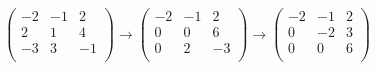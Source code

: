 \documentclass{article}
\begin{document}
\begin{displaymath}
  \displaystyle
  \left(\begin{array}{*{3}{c}}
    -2 & -1 & 2 \\
    2 & 1 & 4 \\
    -3 & 3 & -1\\
  \end{array}\right)
  \to
  \left(\begin{array}{*{3}{c}}
    -2 & -1 & 2 \\
    0 & 0 & 6 \\
    0 & 2 & -3\\
  \end{array}\right)
  \to
  \left(\begin{array}{*{3}{c}}
    -2 & -1 & 2 \\
    0 & -2 & 3\\
    0 & 0 & 6 \\
  \end{array}\right)
\end{displaymath}
\end{document}

